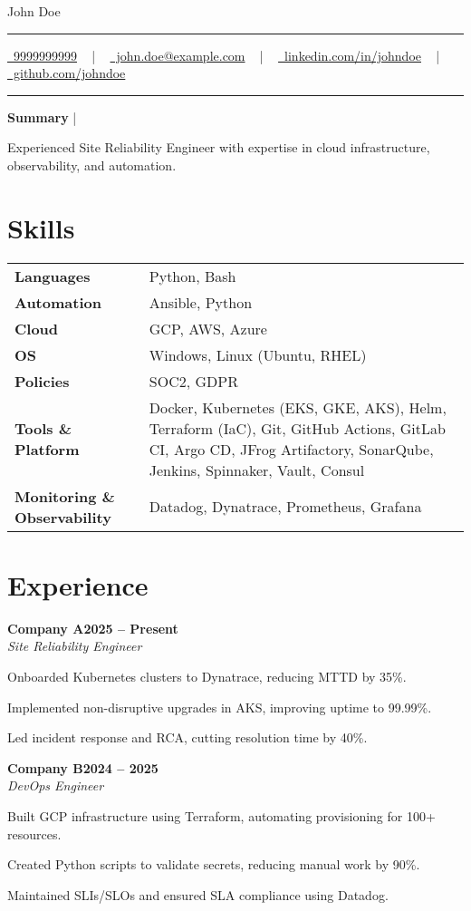 \documentclass[letterpaper,10pt]{article}
\newcommand{\documentTitle}[2]{
  \begin{center}
    {\Huge\color{accentTitle} #1}
    \vspace{10pt}
    {\color{accentLine} \hrule}
    \vspace{2pt}
    \footnotesize{#2}
    \vspace{2pt}
    {\color{accentLine} \hrule}
  \end{center}
}
\newcommand{\tinysection}[1]{
  \phantomsection
  \addcontentsline{toc}{section}{#1}
  {\large{\bfseries\color{accentText}#1} {\color{accentLine} |}}
}
\newcommand{\heading}[2]{
  \hspace{10pt}#1\hfill#2\\
}
\newcommand{\headingBf}[2]{
  \heading{\textbf{#1}}{\textbf{#2}}
}
\newcommand{\headingIt}[2]{
  \heading{\textit{#1}}{\textit{#2}}
}
\newenvironment{resume_list}{
  \vspace{-7pt}
  \begin{itemize}[itemsep=-2px, parsep=1pt, leftmargin=30pt]
}{
  \end{itemize}
}
\begin{document}
\documentTitle{John Doe}{
  \href{tel:9999999999}{\faPhone\ 9999999999} ~ | ~
  \href{mailto:john.doe@example.com}{\faEnvelope\ john.doe@example.com} ~ | ~
  \href{https://linkedin.com/in/johndoe}{\faLinkedin\ linkedin.com/in/johndoe} ~ | ~
  \href{https://github.com/johndoe}{\faGithub\ github.com/johndoe}
}

\tinysection{Summary}
Experienced Site Reliability Engineer with expertise in cloud infrastructure, observability, and automation.

\section{Skills}
\begin{tabularx}{\linewidth}{@{}lX@{}}
\textbf{Languages} & Python, Bash \\
\textbf{Automation} & Ansible, Python \\
\textbf{Cloud} & GCP, AWS, Azure \\
\textbf{OS} & Windows, Linux (Ubuntu, RHEL) \\
\textbf{Policies} & SOC2, GDPR \\
\textbf{Tools \& Platform} & Docker, Kubernetes (EKS, GKE, AKS), Helm, Terraform (IaC), Git, GitHub Actions, GitLab CI, Argo CD, JFrog Artifactory, SonarQube, Jenkins, Spinnaker, Vault, Consul \\
\textbf{Monitoring \& Observability\hspace{6pt}} & Datadog, Dynatrace, Prometheus, Grafana \\
\end{tabularx}

\section{Experience}
\headingBf{Company A}{2025 -- Present}
\headingIt{Site Reliability Engineer}{}
\begin{resume_list}
  \item Onboarded Kubernetes clusters to Dynatrace, reducing MTTD by 35\%.
  \item Implemented non-disruptive upgrades in AKS, improving uptime to 99.99\%.
  \item Led incident response and RCA, cutting resolution time by 40\%.
\end{resume_list}

\headingBf{Company B}{2024 -- 2025}
\headingIt{DevOps Engineer}{}
\begin{resume_list}
  \item Built GCP infrastructure using Terraform, automating provisioning for 100+ resources.
  \item Created Python scripts to validate secrets, reducing manual work by 90\%.
  \item Maintained SLIs/SLOs and ensured SLA compliance using Datadog.
\end{resume_list}
\end{document}

